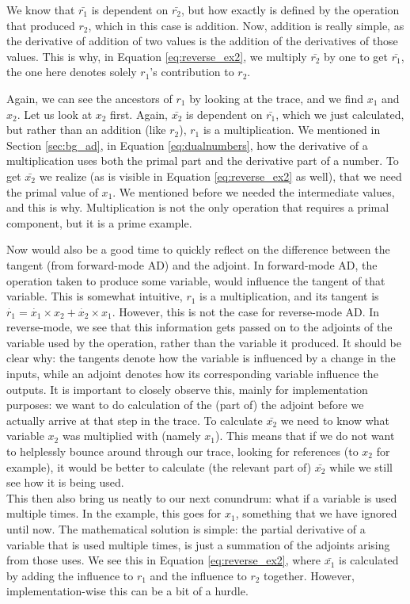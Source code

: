     We know that $\bar{r_1}$ is dependent on $\bar{r_2}$, but how exactly is defined by the operation that produced $r_2$, which in this case is addition.
    Now, addition is really simple, as the derivative of addition of two values is the addition of the derivatives of those values.
    This is why, in Equation \ref{eq:reverse_ex2}, we multiply $\bar{r_2}$ by one to get $\bar{r_1}$, the one here denotes solely $r_1$'s contribution to $r_2$.

    Again, we can see the ancestors of $r_1$ by looking at the trace, and we find $x_1$ and $x_2$.
    Let us look at $x_2$ first.
    Again, $\bar{x_2}$ is dependent on $\bar{r_1}$, which we just calculated, but rather than an addition (like $r_2$), $r_1$ is a multiplication.
    We mentioned in Section \ref{sec:bg_ad}, in Equation \ref{eq:dualnumbers}, how the derivative of a multiplication uses both the primal part and the derivative part of a number.
    To get $\bar{x_2}$ we realize (as is visible in Equation \ref{eq:reverse_ex2} as well), that we need the primal value of $x_1$.
    We mentioned before we needed the intermediate values, and this is why.
    Multiplication is not the only operation that requires a primal component, but it is a prime example.

    Now would also be a good time to quickly reflect on the difference between the tangent (from forward-mode AD) and the adjoint.
    In forward-mode AD, the operation taken to produce some variable, would influence the tangent of that variable.
    This is somewhat intuitive, $r_1$ is a multiplication, and its tangent is $\dot{r_1}=\dot{x_1}\times x_2+\dot{x_2}\times x_1$.
    However, this is not the case for reverse-mode AD.
    In reverse-mode, we see that this information gets passed on to the adjoints of the variable used by the operation, rather than the variable it produced.
    It should be clear why: the tangents denote how the variable is influenced by a change in the inputs, while an adjoint denotes how its corresponding variable influence the outputs.
    It is important to closely observe this, mainly for implementation purposes: we want to do calculation of the (part of) the adjoint before we actually arrive at that step in the trace.
    To calculate $\bar{x_2}$ we need to know what variable $x_2$ was multiplied with (namely $x_1$).
    This means that if we do not want to helplessly bounce around through our trace, looking for references (to $x_2$ for example), it would be better to calculate (the relevant part of) $\bar{x_2}$ while we still see how it is being used.\\
    This then also bring us neatly to our next conundrum: what if a variable is used multiple times.
    In the example, this goes for $x_1$, something that we have ignored until now.
    The mathematical solution is simple: the partial derivative of a variable that is used multiple times, is just a summation of the adjoints arising from those uses.
    We see this in Equation \ref{eq:reverse_ex2}, where $\bar{x_1}$ is calculated by adding the influence to $r_1$ and the influence to $r_2$ together.
    However, implementation-wise this can be a bit of a hurdle.

